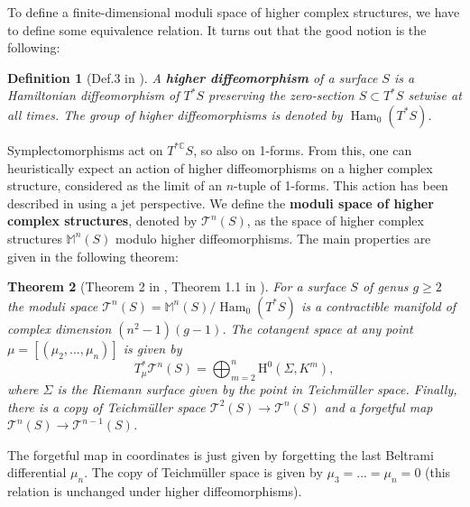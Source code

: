 \documentclass[11pt]{amsart}
\newtheorem{thm}{Theorem}
\newtheorem{definition}[thm]{Definition}
\numberwithin{thm}{section} %
\numberwithin{equation}{section} %
\numberwithin{figure}{section} %
\newcommand*{\C}{\mathbb{C}}
\newcommand*{\M}{\mathbb{M}}
\renewcommand*{\S}{S}
\newcommand*{\mc}{\mathcal}
\newcommand*{\T}{\mc{T}}
\DeclareMathOperator{\Ham}{Ham}
\begin{document}
\medskip
\noindent To define a finite-dimensional moduli space of higher complex structures, we have to define some equivalence relation. It turns out that the good notion is the following:
\begin{definition}[Def.3 in \cite{FockThomas}]
A \textbf{higher diffeomorphism} of a surface $S$ is a Hamiltonian diffeomorphism of $T^*S$ preserving the zero-section $S \subset T^*S$ setwise at all times. The group of higher diffeomorphisms is denoted by $\Ham_0(T^*S)$.
\end{definition}
Symplectomorphisms act on $T^{*\C}S$, so also on 1-forms. From this, one can heuristically expect an action of higher diffeomorphisms on a higher complex structure, considered as the limit of an $n$-tuple of 1-forms. This action has been described in \cite{Nolte} using a jet perspective.
We define the \textbf{moduli space of higher complex structures}, denoted by $\T^n(S)$, as the space of higher complex structures $\mathbb{M}^n(S)$ modulo higher diffeomorphisms.
The main properties are given in the following theorem:
\begin{thm}[Theorem 2 in \cite{FockThomas}, Theorem 1.1 in \cite{Nolte}]\label{mainresultncomplex}
For a surface $\S$ of genus $g\geq 2$ the moduli space $\T^n(\S)=\M^n(\S)/\Ham_0(T^*\S)$ is a contractible manifold of complex dimension $(n^2-1)(g-1)$. The cotangent space at any point $\mu=[(\mu_2,...,\mu_n)]$ is given by 
$$T^*_{\mu}\mathcal{T}^n(S) = \bigoplus_{m=2}^{n} \mathrm{H}^0(\Sigma,K^m),$$
where $\Sigma$ is the Riemann surface given by the point in Teichmüller space. Finally, there is a copy of Teichmüller space $\mc{T}^2(\S)\rightarrow \T^n(\S)$ and a forgetful map $\mathcal{T}^n(\S) \rightarrow \mathcal{T}^{n-1}(\S)$.
\end{thm}
The forgetful map in coordinates is just given by forgetting the last Beltrami differential $\mu_n$. The copy of Teichmüller space is given by $\mu_3=...=\mu_n=0$ (this relation is unchanged under higher diffeomorphisms).
\end{document}
